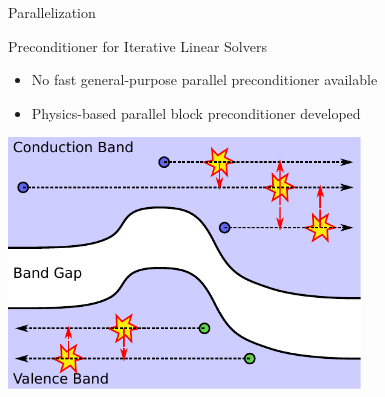 \documentclass[usepdftitle=false,handout,10pt]{beamer}
\begin{document}
\begin{frame}{Parallelization}
 \begin{block}{Preconditioner for Iterative Linear Solvers}
  \begin{itemize}
   \item No fast general-purpose parallel preconditioner available
   \item Physics-based parallel block preconditioner developed
  \end{itemize}
  \begin{center}
   \includegraphics[width=0.7\textwidth]{htransformation}
  \end{center}
 \end{block}

\end{frame}
\end{document}
